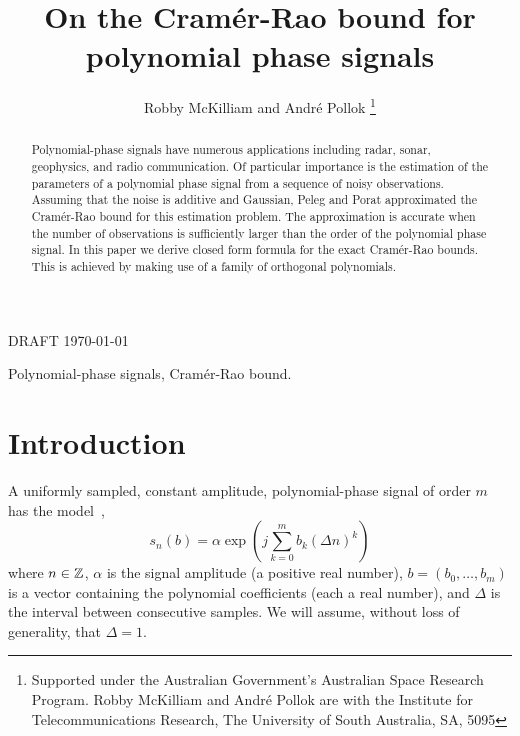 \documentclass[journal,10pt]{IEEEtran}
\begin{document}
\title{On the Cram\'{e}r-Rao bound for polynomial phase signals}

\author{Robby McKilliam and Andr\'{e} Pollok%
\thanks{Supported under the Australian Government's Australian Space Research Program.
Robby McKilliam and Andr\'{e} Pollok are with the Institute for Telecommunications Research, The University of South Australia, SA, 5095}
}
%
{DRAFT \today}



\maketitle


\begin{abstract}
Polynomial-phase signals have numerous applications including radar, sonar, geophysics, and radio communication.  Of particular importance is the estimation of the parameters of a polynomial phase signal from a sequence of noisy observations.  Assuming that the noise is additive and Gaussian,  Peleg and Porat approximated the Cram\'{e}r-Rao bound for this estimation problem.  The approximation is accurate when the number of observations is sufficiently larger than the order of the polynomial phase signal.  In this paper we derive closed form formula for the exact Cram\'{e}r-Rao bounds.  This is achieved by making use of a family of orthogonal polynomials.
\end{abstract}

\begin{IEEEkeywords}
Polynomial-phase signals, Cram\'{e}r-Rao bound.
\end{IEEEkeywords}



\section{Introduction}

A uniformly sampled, constant amplitude, polynomial-phase signal of order $m$ has the model~\cite{Peleg_DPT_1995, Peleg1991_CRB_PPS_1991, Peleg1991_est_class_PPS_1991, Rihaczek1996},
\[
s_n(b) = \alpha \exp\left( j \sum_{k = 0}^{m}{b_k (\Delta n)^k}\right)
\]
where $n \in {\mathbb Z}$, $\alpha$ is the signal amplitude (a positive real number), $b=(b_0, \dots, b_m)$ is a vector containing the polynomial coefficients (each a real number),  and $\Delta$ is the interval between consecutive samples.  We will assume, without loss of generality, that $\Delta = 1$.
\end{document}
